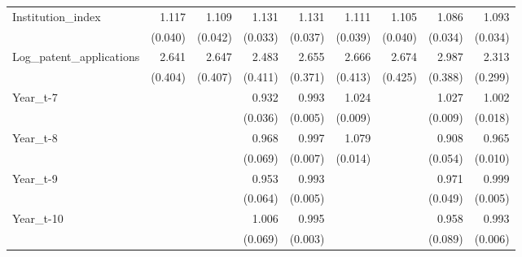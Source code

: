 \begin{table}[htbp]
\begin{tabular}{l*{8}{D{.}{.}{-1}}}
Institution\_index&       1.117\sym{***}&       1.109\sym{***}&       1.131\sym{***}&       1.131\sym{***}&       1.111\sym{***}&       1.105\sym{***}&       1.086\sym{***}&       1.093\sym{***}\\
            &     (0.040)         &     (0.042)         &     (0.033)         &     (0.037)         &     (0.039)         &     (0.040)         &     (0.034)         &     (0.034)         \\
Log\_patent\_applications&       2.641\sym{***}&       2.647\sym{***}&       2.483\sym{***}&       2.655\sym{***}&       2.666\sym{***}&       2.674\sym{***}&       2.987\sym{***}&       2.313\sym{***}\\
            &     (0.404)         &     (0.407)         &     (0.411)         &     (0.371)         &     (0.413)         &     (0.425)         &     (0.388)         &     (0.299)         \\
Year\_t-7    &                     &                     &       0.932\sym{*}  &       0.993         &       1.024\sym{***}&                     &       1.027\sym{***}&       1.002         \\
            &                     &                     &     (0.036)         &     (0.005)         &     (0.009)         &                     &     (0.009)         &     (0.018)         \\
Year\_t-8    &                     &                     &       0.968         &       0.997         &       1.079\sym{***}&                     &       0.908\sym{\%}  &       0.965\sym{***}\\
            &                     &                     &     (0.069)         &     (0.007)         &     (0.014)         &                     &     (0.054)         &     (0.010)         \\
Year\_t-9    &                     &                     &       0.953         &       0.993\sym{\%}  &                     &                     &       0.971         &       0.999         \\
            &                     &                     &     (0.064)         &     (0.005)         &                     &                     &     (0.049)         &     (0.005)         \\
Year\_t-10   &                     &                     &       1.006         &       0.995\sym{\%}  &                     &                     &       0.958         &       0.993         \\
            &                     &                     &     (0.069)         &     (0.003)         &                     &                     &     (0.089)         &     (0.006)         \\

\end{tabular}
\end{table}

